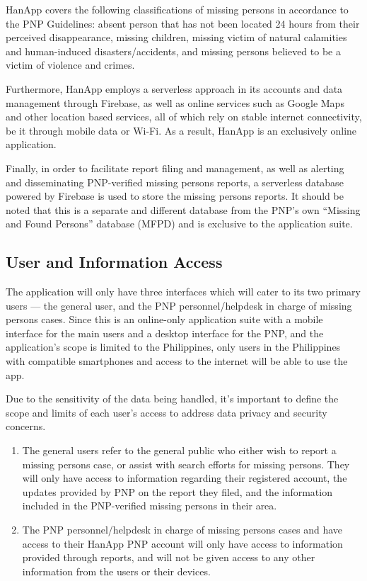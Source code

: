 HanApp covers the following classifications of missing persons in accordance to the PNP Guidelines: absent person that has not been located 24 hours from their perceived disappearance, missing children, missing victim of natural calamities and human-induced disasters/accidents, and missing persons believed to be a victim of violence and crimes.

Furthermore, HanApp employs a serverless approach in its accounts and data management through Firebase, as well as online services such as Google Maps and other location based services, all of which rely on stable internet connectivity, be it through mobile data or Wi-Fi. As a result, HanApp is an exclusively online application.

Finally, in order to facilitate report filing and management, as well as alerting and disseminating PNP-verified missing persons reports, a serverless database powered by Firebase is used to store the missing persons reports. It should be noted that this is a separate and different database from the PNP’s own “Missing and Found Persons” database (MFPD) and is exclusive to the application suite.

\subsection{User and Information Access}
\label{sec:userInfoAcccess}
The application will only have three interfaces which will cater to its two primary users — the general user, and the PNP personnel/helpdesk in charge of missing persons cases. Since this is an online-only application suite with a mobile interface for the main users and a desktop interface for the PNP, and the application’s scope is limited to the Philippines, only users in the Philippines with compatible smartphones and access to the internet will be able to use the app.

Due to the sensitivity of the data being handled, it’s important to define the scope and limits of each user’s access to address data privacy and security concerns.

\begin{enumerate}
    \item The general users refer to the general public who either wish to report a missing persons case, or assist with search efforts for missing persons. They will only have access to information regarding their registered account, the updates provided by PNP on the report they filed, and the information included in the PNP-verified missing persons in their area.
    \item The PNP personnel/helpdesk in charge of missing persons cases and have access to their HanApp PNP account will only have access to information provided through reports, and will not be given access to any other information from the users or their devices.
\end{enumerate}


